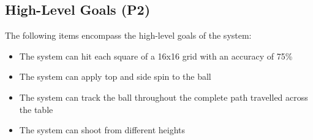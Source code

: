 \documentclass[11pt]{article}
\begin{document}
\subsection{High-Level Goals (P2)}
The following items encompass the high-level goals of the system:
\begin{itemize}
\item The system can hit each square of a 16x16 grid with an accuracy of 75\%
\item The system can apply top and side spin to the ball
\item The system can track the ball throughout the complete path travelled across the table
\item The system can shoot from different heights
\end{itemize}
\end{document}
